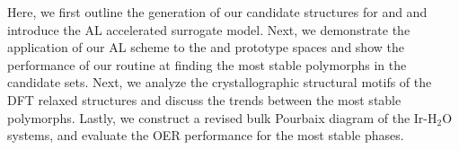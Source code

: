 %
Here, we first outline the generation of our candidate structures for \IrOtwo and \IrOthree and introduce the AL accelerated surrogate model.
%
Next, we demonstrate the application of our AL scheme to the \IrOtwo and \IrOthree prototype spaces and show the performance of our routine at finding the most stable polymorphs in the candidate sets.
%
Next, we analyze the crystallographic structural motifs of the DFT relaxed structures and discuss the trends between the most stable polymorphs.
%
Lastly, we construct a revised bulk Pourbaix diagram of the Ir-H$_2$O systems, and evaluate the OER performance for the most stable phases.
%

